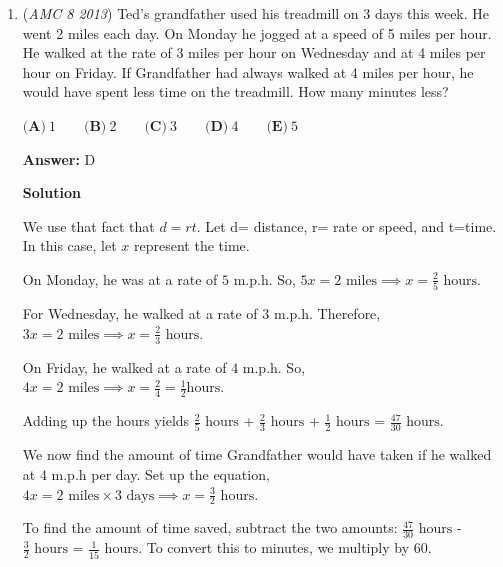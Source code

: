 \begin{enumerate}
 



\textbf{Solution 3}

From Solution 1, the prime factorization of $180 = 2^2 \cdot 3^2 \cdot 5$.The prime factorization of $594 = 2 \cdot 3^3 \cdot 11$.Hence, $\operatorname{lcm} (180,594) = 2^2 \cdot 3^3 \cdot 5 \cdot 11$, and $\operatorname{gcf} (180,594) = 2 \cdot 3^2$.Therefore, $\frac{\operatorname{lcm} (180,594)}{\operatorname{gcf} (180,594)} = \frac{2^2 \cdot 3^3 \cdot 5 \cdot 11}{2 \cdot 3^2} = 2 \cdot 3 \cdot 5 \cdot 11 = 330 \Longrightarrow \boxed{\textbf{(C)}\ 330}$



	\item (\textit{AMC 8 2013}) Ted's grandfather used his treadmill on 3 days this week. He went 2 miles each day. On Monday he jogged at a speed of 5 miles per hour. He walked at the rate of 3 miles per hour on Wednesday and at 4 miles per hour on Friday. If Grandfather had always walked at 4 miles per hour, he would have spent less time on the treadmill. How many minutes less?


 $\textbf{(A)}\ 1 \qquad \textbf{(B)}\ 2 \qquad \textbf{(C)}\ 3 \qquad \textbf{(D)}\ 4 \qquad \textbf{(E)}\ 5$

 \textbf{Answer: }D



\textbf{Solution}

We use that fact that $d=rt$. Let d= distance, r= rate or speed, and t=time. In this case, let $x$ represent the time.

 On Monday, he was at a rate of $5 \text{ m.p.h}$. So, $5x = 2 \text{ miles}\implies x = \frac{2}{5} \text { hours}$. 

 For Wednesday, he walked at a rate of $3 \text{ m.p.h}$. Therefore, $3x = 2 \text{ miles}\implies x = \frac{2}{3}  \text { hours}$. 

 On Friday, he walked at a rate of $4 \text{ m.p.h}$. So, $4x = 2 \text{ miles}\implies x=\frac{2}{4}=\frac{1}{2}  \text {hours}$.  

 Adding up the hours yields $\frac{2}{5}  \text { hours}$ + $\frac{2}{3}  \text { hours}$ + $\frac{1}{2}  \text { hours}$ = $\frac{47}{30}  \text { hours}$.

 We now find the amount of time Grandfather would have taken if he walked at $4 \text{ m.p.h}$ per day. Set up the equation, $4x = 2 \text{ miles} \times  3 \text{ days}\implies x = \frac{3}{2}  \text { hours}$.

 To find the amount of time saved, subtract the two amounts: $\frac{47}{30}  \text { hours}$ - $\frac{3}{2}  \text { hours}$ = $\frac{1}{15}  \text { hours}$. To convert this to minutes, we multiply by $60$.


\end{enumerate}

